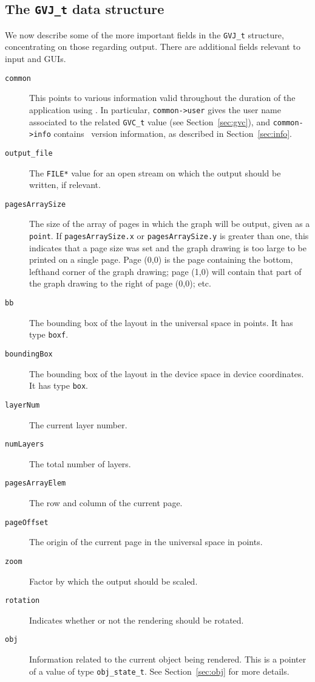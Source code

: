 \subsection{The {\tt GVJ\_t} data structure}
\label{sec:gvjfields}
We now describe some of the more important fields in the {\tt GVJ\_t} structure,
concentrating on those regarding output. There are additional fields
relevant to input and GUIs.
\begin{description}
\item[{\tt common}]
This points to various information valid throughout the duration
of the application using \gviz. In particular, {\tt common->user}
gives the user name associated to the related {\tt GVC\_t} value
(see Section~\ref{sec:gvc}), and {\tt common->info} contains \gviz\ version
information, as described in Section~\ref{sec:info}.
\item[{\tt output\_file}]
The {\tt FILE*} value for an open stream on
which the output should be written, if relevant.
\item[{\tt pagesArraySize}]
The size of the array of pages in which the graph will be output,
given as a {\tt point}.
If {\tt pagesArraySize.x} or {\tt pagesArraySize.y} is greater than one, 
this indicates that a
page size was set and the graph drawing is too large to be printed on a
single page.
Page (0,0) is the page containing the bottom, lefthand corner
of the graph drawing; page (1,0) will contain that part of the graph
drawing to the right of page (0,0); etc. 
\item[{\tt bb}]
The bounding box of the layout in the universal space
in points. It has type {\tt boxf}.
\item[{\tt boundingBox}]
The bounding box of the layout in the device space in
device coordinates. It has type {\tt box}.
\item[{\tt layerNum}]
The current layer number.
\item[{\tt numLayers}]
The total number of layers.
\item[{\tt pagesArrayElem}]
The row and column of the current page.
\item[{\tt pageOffset}]
The origin of the current page in the universal space in points. 
\item[{\tt zoom}]
Factor by which the output should be scaled.
\item[{\tt rotation}]
Indicates whether or not the rendering should be rotated.
\item[{\tt obj}]
Information related to the current object being rendered.
This is a pointer of a value of type {\tt obj\_state\_t}.
See Section~\ref{sec:obj} for more details.
\end{description}

